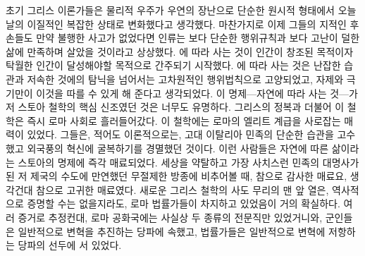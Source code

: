 초기 그리스 이론가들은 물리적 우주가 우연의 장난으로 단순한 원시적 형태에서
오늘날의 이질적인 복잡한 상태로 변화했다고 생각했다.
마찬가지로 이제 그들의 지적인 후손들도 만약 불행한 사고가 없었다면
인류는 보다 단순한 행위규칙과 보다 고난이 덜한 삶에 만족하며
살았을 것이라고 상상했다.
에 따라 사는 것이 인간이 창조된 목적이자
탁월한 인간이 달성해야할 목적으로 간주되기 시작했다.
에 따라 사는 것은 난잡한 습관과 저속한 것에의 탐닉을 넘어서는
고차원적인 행위법칙으로 고양되었고, 자제와 극기만이
이것을 따를 수 있게 해 준다고 생각되었다.
이 명제---자연에 따라 사는 것---가 저 스토아 철학의 핵심 신조였던 것은
너무도 유명하다.
그리스의 정복과 더불어 이 철학은 즉시 로마 사회로 흘러들어갔다.
이 철학에는 로마의 엘리트 계급을 사로잡는 매력이 있었다. 그들은, 적어도 이론적으로는,
고대 이탈리아 민족의 단순한 습관을 고수했고
외국풍의 혁신에 굴복하기를 경멸했던 것이다.
이런 사람들은 자연에 따른 삶이라는 스토아의 명제에 즉각 매료되었다.
세상을 약탈하고 가장 사치스런 민족의 대명사가 된 저 제국의 수도에 만연했던
무절제한 방종에 비추어볼 때, 참으로 감사한 매료요, 생각건대 참으로 고귀한 매료였다.
새로운 그리스 철학의 사도 무리의 맨 앞 열은,
역사적으로 증명할 수는 없을지라도, 로마 법률가들이 차지하고 있었음이 거의 확실하다.
여러 증거로 추정컨대,
로마 공화국에는 사실상 두 종류의 전문직만 있었거니와,
군인들은 일반적으로 변혁을 추진하는 당파에 속했고,
법률가들은 일반적으로 변혁에 저항하는 당파의 선두에 서 있었다.

